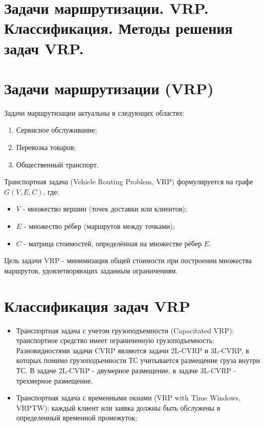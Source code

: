 {
	\section{Задачи маршрутизации. VRP. Классификация. Методы решения задач VRP.}

	\section*{Задачи маршрутизации (VRP)}

Задачи маршрутизации актуальны в следующих областях:
\begin{enumerate}
  \item Сервисное обслуживание;
  \item Перевозка товаров;
  \item Общественный транспорт.
\end{enumerate}

Транспортная задача (Vehicle Routing Problem, VRP) формулируется на графе $G(V, E, C)$, где:
\begin{itemize}
  \item $V$ - множество вершин (точек доставки или клиентов);
  \item $E$ - множество рёбер (маршрутов между точками);
  \item $C$ - матрица стоимостей, определённая на множестве рёбер $E$.
\end{itemize}

Цель задачи VRP - минимизация общей стоимости при построении множества маршрутов, удовлетворяющих заданным ограничениям.

\section*{Классификация задач VRP}

\begin{itemize}
  \item Транспортная задача с учетом грузоподъемности (Capacitated VRP): транспортное средство имеет ограниченную грузоподъемность; Разновидностями задачи CVRP являются задачи 2L-CVRP и 3L-CVRP, в которых помимо грузоподъемности ТС учитывается размещение груза внутри ТС. В задаче 2L-CVRP - двумерное размещение, в задаче 3L-CVRP - трехмерное размещение.

  \item Транспортная задача с временными окнами (VRP with Time Windows, VRPTW): каждый клиент или заявка должны быть обслужены в определенный временной промежуток;


\end{itemize}}
